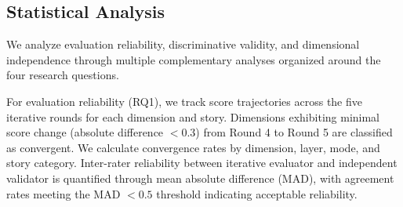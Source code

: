 \begin{table}[t]
\centering
\caption{Implementation specifications}
\label{tab:implementation_specs}
\small
{}
\end{table}

\subsection{Statistical Analysis}

We analyze evaluation reliability, discriminative validity, and dimensional independence through multiple complementary analyses organized around the four research questions.

For evaluation reliability (RQ1), we track score trajectories across the five iterative rounds for each dimension and story. Dimensions exhibiting minimal score change (absolute difference $< 0.3$) from Round 4 to Round 5 are classified as convergent. We calculate convergence rates by dimension, layer, mode, and story category. Inter-rater reliability between iterative evaluator and independent validator is quantified through mean absolute difference (MAD), with agreement rates meeting the MAD $< 0.5$ threshold indicating acceptable reliability.

